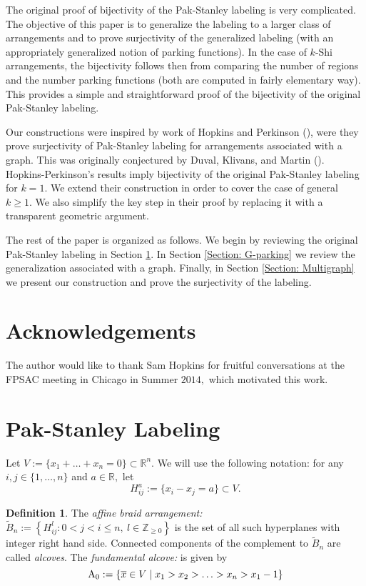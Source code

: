 \documentclass[12pt]{amsart}
\newcommand{\Afund}{{\rm A}_0}  %
\newcommand{\aBrn}{\widetilde{B}_n} %
\newcommand{\ZZ}{\mathbb{Z}_{\ge 0}}
\theoremstyle{definition}
\newtheorem{definition}{Definition}[section]
\begin{document}
The original proof of bijectivity of the Pak-Stanley labeling is very complicated. The objective of this paper is to generalize the labeling to a larger class of arrangements and to prove surjectivity of the generalized labeling (with an appropriately generalized notion of parking functions). In the case of $k$-Shi arrangements, the bijectivity follows then from comparing the number of regions and the number parking functions (both are computed in fairly elementary way). This provides a simple and straightforward proof of the bijectivity of the original Pak-Stanley labeling.

Our constructions were inspired by work of Hopkins and Perkinson (\cite{HP12}), were they prove surjectivity of Pak-Stanley labeling for arrangements associated with a graph. This was originally conjectured by Duval, Klivans, and Martin (\cite{DKM11}). Hopkins-Perkinson's results imply bijectivity of the original Pak-Stanley labeling for $k=1.$ We extend their construction in order to cover the case of general $k\ge 1.$ We also simplify the key step in their proof by replacing it with a transparent geometric argument.

The rest of the paper is organized as follows. We begin by reviewing the original Pak-Stanley labeling in Section \ref{Section: Pak-Stanley}. In Section \ref{Section: G-parking} we review the generalization associated with a graph. Finally, in Section \ref{Section: Multigraph} we present our construction and prove the surjectivity of the labeling.

\section*{Acknowledgements}

The author would like to thank Sam Hopkins for fruitful conversations at the FPSAC meeting in Chicago in Summer $2014,$ which motivated this work.  



\section{Pak-Stanley Labeling}\label{Section: Pak-Stanley}
Let $V:=\{x_1+\ldots+x_n=0\}\subset\mathbb R^n.$ We will use the following notation: for any $i,j\in\{1,\ldots,n\}$ and $a\in\mathbb R,$ let 
$$
H_{ij}^a:=\{x_i-x_j=a\}\subset V.
$$ 

\begin{definition}
The {\it affine braid arrangement:} $\aBrn:=\left\{H_{ij}^l:0<j<i\le n,\ l\in\ZZ \right\}$ is the set of all such hyperplanes with integer right hand side. Connected components of the complement to $\aBrn$ are called {\it alcoves}. The {\it fundamental alcove:} is given by
$$
\Afund:=\{ 
\overline{x}\in V \mid
x_1>x_2>\ldots>x_n>x_1-1\}
$$
\end{definition}
\end{document}
